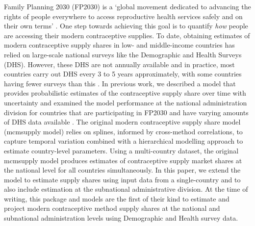Family Planning 2030 (FP2030) is a `global movement dedicated to advancing the rights of people everywhere to access reproductive health services safely and on their own terms' \citep{FP2030commitments}. One step towards achieving this goal is to quantify \textit{how} people are accessing their modern contraceptive supplies. To date, obtaining estimates of modern contraceptive supply shares in low- and middle-income countries has relied on large-scale national surveys like the Demographic and Health Surveys (DHS). However, these DHS are not annually available and in practice, most countries carry out DHS every 3 to 5 years approximately, with some countries having fewer surveys than this \citep{DHSTypes}. In previous work, we described a model that provides probabilistic estimates of the contraceptive supply share over time with uncertainty and examined the model performance at the national administration division for countries that are participating in FP2030 and have varying amounts of DHS data available \citep{Comiskey2023}. The original modern contraceptive supply share model (mcmsupply model) relies on splines, informed by cross-method correlations, to capture temporal variation combined with a hierarchical modelling approach to estimate country-level parameters. Using a multi-country dataset, the original mcmsupply model produces estimates of contraceptive supply market shares at the national level for all countries simultaneously. In this paper, we extend the model to estimate supply shares using input data from a single-country and to also include estimation at the subnational administrative division. At the time of writing, this package and models are the first of their kind to estimate and project modern contraceptive method supply shares at the national and subnational administration levels using Demographic and Health survey data.

